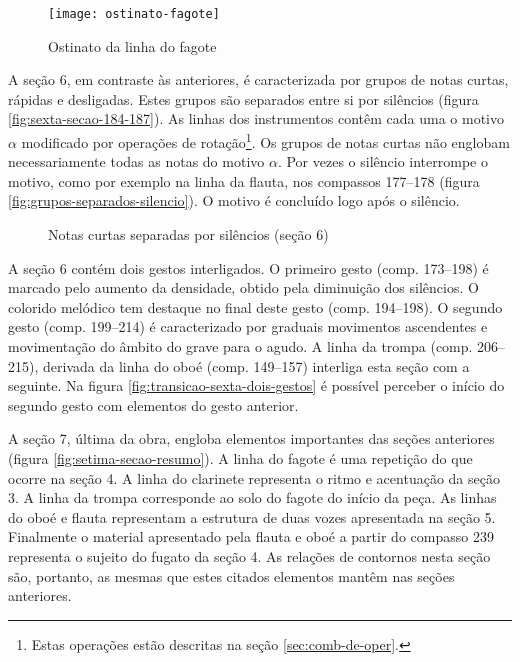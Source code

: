 \begin{figure}
  \centering
  \texttt{[image: ostinato-fagote]}
  \caption{Ostinato da linha do fagote}
  \label{fig:ostinato-fagote}
\end{figure}

A seção 6, em contraste às anteriores, é caracterizada por grupos de
notas curtas, rápidas e desligadas. Estes grupos são separados entre
si por silêncios (figura \ref{fig:sexta-secao-184-187}). As linhas dos
instrumentos contêm cada uma o motivo $\alpha$ modificado por
operações de rotação\footnote{Estas operações estão descritas na seção
  \ref{sec:comb-de-oper}.}. Os grupos de notas curtas não englobam
necessariamente todas as notas do motivo $\alpha$. Por vezes o
silêncio interrompe o motivo, como por exemplo na linha da flauta, nos
compassos 177--178 (figura \ref{fig:grupos-separados-silencio}). O
motivo é concluído logo após o silêncio.

\begin{figure}
  \centering


  \caption{Notas curtas separadas por silêncios (seção 6)}
  \label{fig:sexta-secao-notas-curtas}
\end{figure}

A seção 6 contém dois gestos interligados. O primeiro gesto
(comp. 173--198) é marcado pelo aumento da densidade, obtido pela
diminuição dos silêncios. O colorido melódico tem destaque no final
deste gesto (comp. 194--198). O segundo gesto (comp. 199--214) é
caracterizado por graduais movimentos ascendentes e movimentação do
âmbito do grave para o agudo. A linha da trompa (comp. 206--215),
derivada da linha do oboé (comp. 149--157) interliga esta seção com a
seguinte. Na figura \ref{fig:transicao-sexta-dois-gestos} é possível
perceber o início do segundo gesto com elementos do gesto anterior.

A seção 7, última da obra, engloba elementos importantes das seções
anteriores (figura \ref{fig:setima-secao-resumo}). A linha do fagote é
uma repetição do que ocorre na seção 4. A linha do clarinete
representa o ritmo e acentuação da seção 3. A linha da trompa
corresponde ao solo do fagote do início da peça. As linhas do oboé e
flauta representam a estrutura de duas vozes apresentada na seção
5. Finalmente o material apresentado pela flauta e oboé a partir do
compasso 239 representa o sujeito do fugato da seção 4. As relações de
contornos nesta seção são, portanto, as mesmas que estes citados
elementos mantêm nas seções anteriores.


